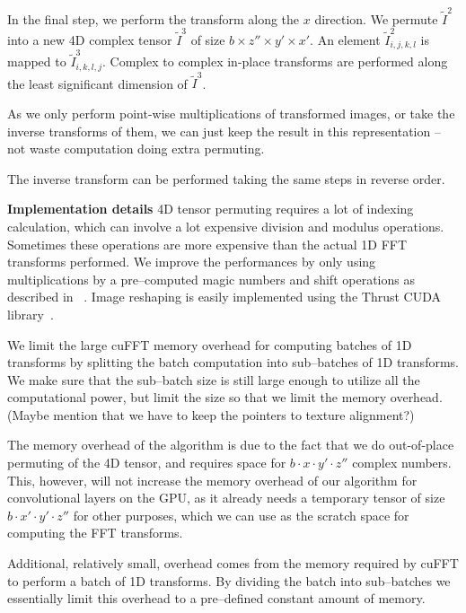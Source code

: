 \documentclass[conference]{IEEEtran}
\begin{document}
  In the final step, we perform the transform along the $x$ direction.
  We permute $\widetilde{I}^2$ into a new 4D complex tensor
  $\widetilde{I}^3$ of size $b \times z'' \times y' \times x'$.  An
  element $\widetilde{I}^2_{i,j,k,l}$ is mapped to
  $\widetilde{I}^3_{i,k,l,j}$.  Complex to complex in-place transforms
  are performed along the least significant dimension of
  $\widetilde{I}^3$.

  As we only perform point-wise multiplications of transformed images,
  or take the inverse transforms of them, we can just keep the result
  in this representation -- not waste computation doing extra
  permuting.

  The inverse transform can be performed taking the same steps in
  reverse order.

  {\bf Implementation details} 4D tensor permuting requires a lot of
  indexing calculation, which can involve a lot expensive division and
  modulus operations.  Sometimes these operations are more expensive
  than the actual 1D FFT transforms performed.  We improve the
  performances by only using multiplications by a pre--computed magic
  numbers and shift operations as described in
  ~\cite{warren2013hacker}.  Image reshaping is easily implemented
  using the Thrust CUDA library~\cite{bell2011thrust}.

  We limit the large cuFFT memory overhead for computing batches of 1D
  transforms by splitting the batch computation into sub--batches of
  1D transforms.  We make sure that the sub--batch size is still large
  enough to utilize all the computational power, but limit the size so
  that we limit the memory overhead.  (Maybe mention that we have to
  keep the pointers to texture alignment?)

  The memory overhead of the algorithm is due to the fact that we do
  out-of-place permuting of the 4D tensor, and requires space for $b
  \cdot x \cdot y' \cdot z''$ complex numbers.  This, however, will
  not increase the memory overhead of our algorithm for convolutional
  layers on the GPU, as it already needs a temporary tensor of size $b
  \cdot x' \cdot y' \cdot z''$ for other purposes, which we can use as
  the scratch space for computing the FFT transforms.

  Additional, relatively small, overhead comes from the memory
  required by cuFFT to perform a batch of 1D transforms.  By dividing
  the batch into sub--batches we essentially limit this overhead to a
  pre--defined constant amount of memory.
\end{document}
